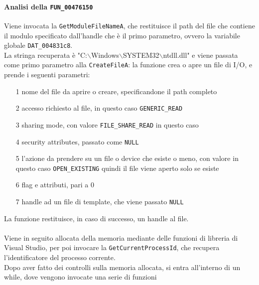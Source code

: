 \documentclass[12pt]{extarticle}
\begin{document}
\paragraph{Analisi della \texttt{FUN\_00476150}} Viene invocata la \texttt{GetModuleFileNameA}, che restituisce il path del file che contiene il modulo specificato dall'handle che è il primo parametro, ovvero la variabile globale \texttt{DAT\_004831c8}.\\La stringa recuperata è "C:$\backslash$Windows$\backslash$SYSTEM32$\backslash$ntdll.dll" e viene passata come primo parametro alla \texttt{CreateFileA}: la funzione crea o apre un file di I/O, e prende i seguenti parametri:
\begin{itemize}
    \item[1] nome del file da aprire o creare, specificandone il path completo
    \item[2] accesso richiesto al file, in questo caso \texttt{GENERIC\_READ}
    \item[3] sharing mode, con valore \texttt{FILE\_SHARE\_READ} in questo caso
    \item[4] security attributes, passato come \texttt{NULL}
    \item[5] l'azione da prendere su un file o device che esiste o meno, con valore in questo caso \texttt{OPEN\_EXISTING} quindi il file viene aperto solo se esiste 
    \item[6] flag e attributi, pari a 0
    \item[7] handle ad un file di template, che viene passato \texttt{NULL}
\end{itemize}
La funzione restituisce, in caso di successo, un handle al file.\\\\Viene in seguito allocata della memoria mediante delle funzioni di libreria di Visual Studio, per poi invocare la \texttt{GetCurrentProcessId}, che recupera l'identificatore del processo corrente.\\Dopo aver fatto dei controlli sulla memoria allocata, si entra all'interno di un while, dove vengono invocate una serie di funzioni
\end{document}
